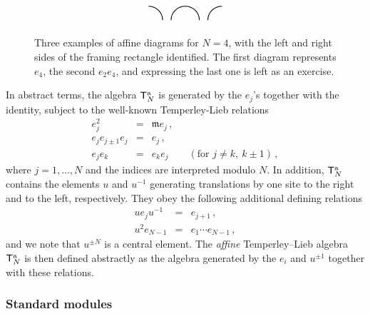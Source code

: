 \documentclass[a4paper,10pt]{article}
\newcommand{\linnea}[1]{$\framebox{\tiny L}$\ \textbf{\texttt{{\color{red}\footnotesize#1}}}}
\newcommand{\ATL}[1]{\mathsf{T}^{\rm a}_{#1}}
\newcommand{\m}{\mathfrak{m}}
\begin{document}
\begin{figure}
\begin{equation*}
\begin{tikzpicture}
	\draw[thick] (0.5,-0.8) arc (0:90:0.5 and 0.5);
	\draw[thick] (1.8,-0.8) arc (0:180:0.5 and 0.5);
	\draw[thick] (2.1,-0.8) arc (0:90:-0.5 and 0.5);
	\end{tikzpicture}
\end{equation*}
\caption{Three examples of affine diagrams for $N=4$, with the left and right sides of the framing rectangle identified. The first diagram represents $e_4$, the second $e_2 e_4$, and expressing the last one is left as an exercise. 
}
\label{fig:aff-diag}
\end{figure}

In abstract terms,
the algebra $\ATL{N}$ is generated by the $e_j$'s together with the identity, subject to the well-known Temperley-Lieb relations \cite{TL71}
%
\begin{subequations}
\label{TL}
\begin{eqnarray}
e_j^2&=&\m e_j \,, \\
e_je_{j\pm 1}e_j&=&e_j \,, \\
e_je_k&=&e_ke_j\qquad(\mbox{for } j\neq k,~k\pm 1) \,,
\end{eqnarray}
\end{subequations}
%
where $j=1,\ldots,N$ and the indices are interpreted modulo $N$.
In addition, $\ATL{N}$ contains the elements
 $u$ and $u^{-1}$ generating translations by one site to the right
and to the left, respectively. They obey the following additional defining
relations
%
\begin{subequations}
\label{TL-u}
\begin{eqnarray}
ue_ju^{-1}&=&e_{j+1} \,, \\
u^2e_{N-1}&=&e_1 \cdots e_{N-1} \,,
\end{eqnarray}
\end{subequations}
%
and we note that $u^{\pm N}$ is a central element.
The \textit{affine} Temperley--Lieb algebra $\ATL{N}$ is then defined abstractly as the algebra generated by the $e_i$ and $u^{\pm1}$ together with these  relations.


\subsubsection{Standard modules} \label{sec:stdmod}
\end{document}
